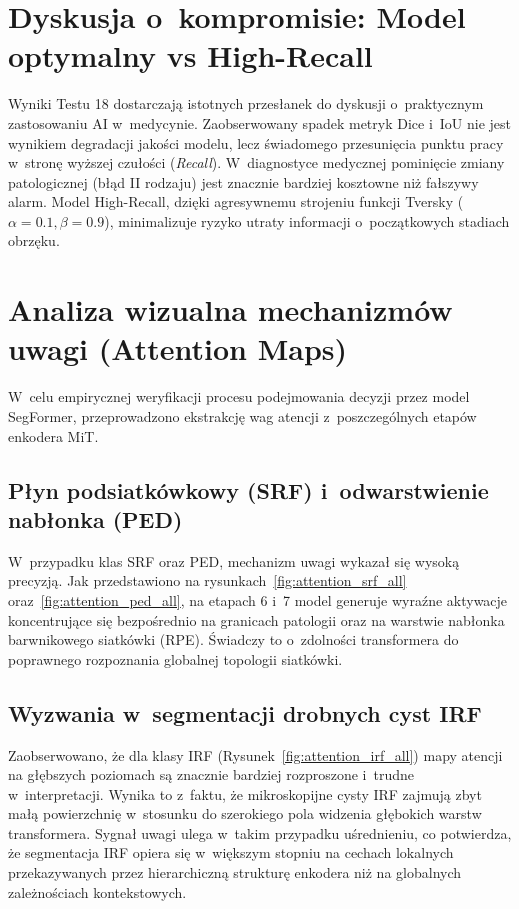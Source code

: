 \documentclass[12pt,a4paper,oneside]{report}
\begin{document}
\section{Dyskusja o~kompromisie: Model optymalny vs High-Recall}
Wyniki Testu 18 dostarczają istotnych przesłanek do dyskusji o~praktycznym zastosowaniu AI w~medycynie. Zaobserwowany spadek metryk Dice i~IoU nie jest wynikiem degradacji jakości modelu, lecz świadomego przesunięcia punktu pracy w~stronę wyższej czułości (\textit{Recall}). W~diagnostyce medycznej pominięcie zmiany patologicznej (błąd II rodzaju) jest znacznie bardziej kosztowne niż fałszywy alarm. Model High-Recall, dzięki agresywnemu strojeniu funkcji Tversky ($\alpha=0.1, \beta=0.9$), minimalizuje ryzyko utraty informacji o~początkowych stadiach obrzęku.

\section{Analiza wizualna mechanizmów uwagi (Attention Maps)}
W~celu empirycznej weryfikacji procesu podejmowania decyzji przez model SegFormer, przeprowadzono ekstrakcję wag atencji z~poszczególnych etapów enkodera MiT. 

\subsection{Płyn podsiatkówkowy (SRF) i~odwarstwienie nabłonka (PED)}
W~przypadku klas SRF oraz PED, mechanizm uwagi wykazał się wysoką precyzją. Jak przedstawiono na rysunkach~\ref{fig:attention_srf_all} oraz~\ref{fig:attention_ped_all}, na etapach 6 i~7 model generuje wyraźne aktywacje koncentrujące się bezpośrednio na granicach patologii oraz na warstwie nabłonka barwnikowego siatkówki (RPE). Świadczy to o~zdolności transformera do poprawnego rozpoznania globalnej topologii siatkówki.

\subsection{Wyzwania w~segmentacji drobnych cyst IRF}
Zaobserwowano, że dla klasy IRF (Rysunek~\ref{fig:attention_irf_all}) mapy atencji na głębszych poziomach są znacznie bardziej rozproszone i~trudne w~interpretacji. Wynika to z~faktu, że mikroskopijne cysty IRF zajmują zbyt małą powierzchnię w~stosunku do szerokiego pola widzenia głębokich warstw transformera. Sygnał uwagi ulega w~takim przypadku uśrednieniu, co potwierdza, że segmentacja IRF opiera się w~większym stopniu na cechach lokalnych przekazywanych przez hierarchiczną strukturę enkodera niż na globalnych zależnościach kontekstowych.
\end{document}
